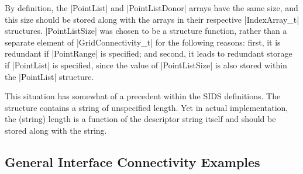 By definition, the |PointList| and |PointListDonor| arrays have the
same size, and this size should be stored along with the arrays in
their respective |IndexArray_t| structures.
|PointListSize| was chosen to be a structure function, rather than a
separate element of |GridConnectivity_t| for the following reasons:
first, it is redundant if |PointRange| is specified; and second, it
leads to redundant storage if |PointList| is specified, since the value
of |PointListSize| is also stored within the |PointList| structure.

This situation has somewhat of a precedent within the SIDS definitions.
The structure  contains a string of unspecified length.
Yet in  actual implementation, the (string) length is a function of the
descriptor string itself and should be stored along with the string.

\subsection{General Interface Connectivity Examples}
\label{s:cnct_gen_example}

